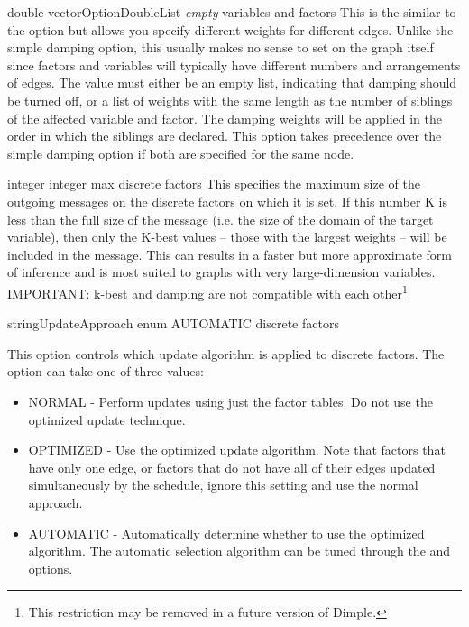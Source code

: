 {\ifmatlab double vector\fi \ifjava OptionDoubleList\fi}
{\textit{empty}}
{variables and factors}
{This is the similar to the  option but allows you specify different weights for different edges. Unlike the simple damping option, this usually makes no sense to set on the graph itself since factors and variables will typically have different numbers and arrangements of edges. The value must either be an empty list, indicating that damping should be turned off, or a list of weights with the same length as the number of siblings of the affected variable and factor. The damping weights will be applied in the order in which the siblings are declared.
\linebreak
\linebreak
This option takes precedence over the simple damping option if both are specified for the same node.
}


{integer}
{integer max}
{discrete factors}
{This specifies the maximum size of the outgoing messages on the discrete factors on which it is set. If this number K is less than the full size of the message (i.e. the size of the domain of the target variable), then only the K-best values -- those with the largest weights -- will be included in the message. This can results in a faster but more approximate form of inference and is most suited to graphs with very large-dimension variables.
\linebreak
\linebreak
IMPORTANT: k-best and damping are not compatible with each other\footnote{This restriction may be removed in a future version of Dimple.}}


{\ifmatlab string\fi \ifjava UpdateApproach enum\fi}
{AUTOMATIC}
{discrete factors}
{This option controls which update algorithm is applied to discrete factors. The option can take one of three values:
\begin{itemize}
\item NORMAL - Perform updates using just the factor tables. Do not use the optimized update technique.
\item OPTIMIZED - Use the optimized update algorithm. Note that factors that have only one edge, or factors that do not have all of their edges updated simultaneously by the schedule, ignore this setting and use the normal approach.
\item AUTOMATIC - Automatically determine whether to use the optimized algorithm. The automatic selection algorithm can be tuned through the  and  options.
\end{itemize}
}


